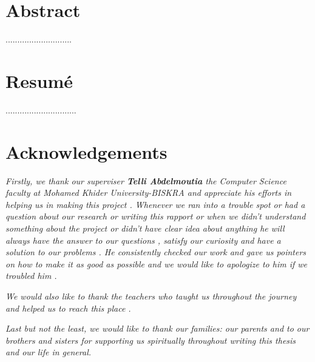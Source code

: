 \documentclass[12pt,a4paper]{article}
\begin{document}

\newpage
\section*{Abstract}

{............................}\\




 
\section*{Resumé}
 {..............................}\\
 

\newpage

\section*{Acknowledgements}
\begin{center}
    
\textit{Firstly, we  thank our superviser \textbf{Telli Abdelmoutia} the Computer Science faculty at Mohamed Khider University-BISKRA and appreciate his efforts in helping us in making this project . Whenever we ran into a trouble spot or had a question about our research or writing this rapport or when we didn't understand something about the project  or didn't have clear idea about anything he will always have the answer to our questions , satisfy our curiosity and have a solution to our problems . He consistently checked our work and gave us pointers on how to make it as good as possible and we would like to apologize to him if we troubled him .}

\textit{We would also like to thank the teachers who taught us throughout the journey and helped us to reach this place .}

\textit{Last but not the least, we would like to thank our families: our parents and to our brothers and sisters for supporting us spiritually throughout writing this thesis and
our life in general.}
\end{center}
\newpage
\tableofcontents{}


 


  

 \listoffigures

 


\newpage




 \appendix
%

\printbibliography


\newpage

 
\end{document}
